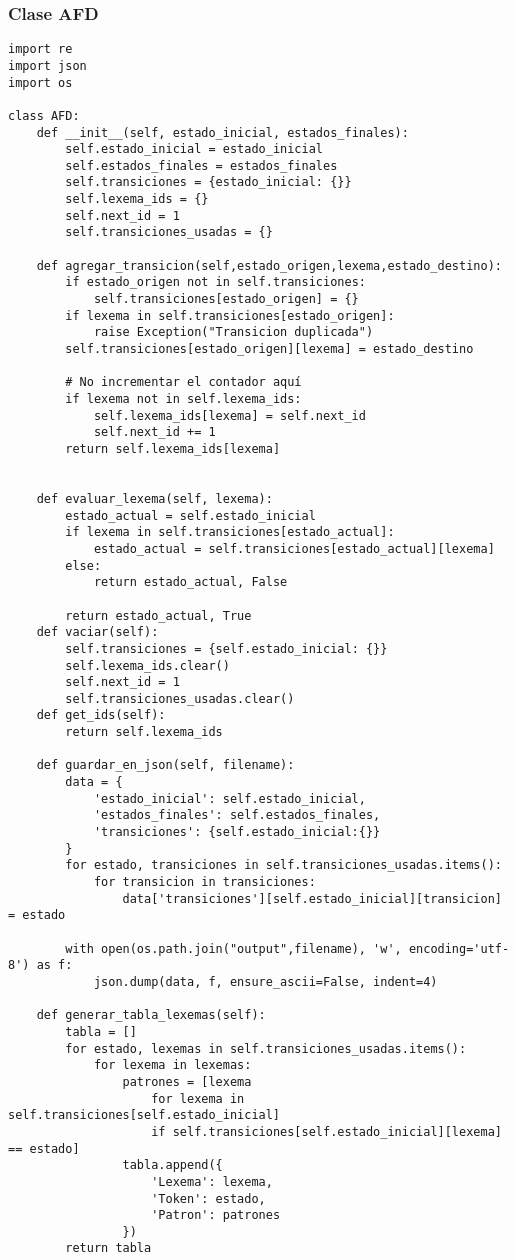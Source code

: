 \documentclass[12pt,a4paper]{article}
\begin{document}
\subsubsection{Clase AFD}

\begin{verbatim}
import re
import json
import os

class AFD:
    def __init__(self, estado_inicial, estados_finales):
        self.estado_inicial = estado_inicial
        self.estados_finales = estados_finales
        self.transiciones = {estado_inicial: {}}
        self.lexema_ids = {}
        self.next_id = 1
        self.transiciones_usadas = {}  
        
    def agregar_transicion(self,estado_origen,lexema,estado_destino):
        if estado_origen not in self.transiciones:
            self.transiciones[estado_origen] = {}
        if lexema in self.transiciones[estado_origen]:
            raise Exception("Transicion duplicada")
        self.transiciones[estado_origen][lexema] = estado_destino
        
        # No incrementar el contador aquí
        if lexema not in self.lexema_ids:
            self.lexema_ids[lexema] = self.next_id
            self.next_id += 1
        return self.lexema_ids[lexema]


    def evaluar_lexema(self, lexema):
        estado_actual = self.estado_inicial
        if lexema in self.transiciones[estado_actual]:
            estado_actual = self.transiciones[estado_actual][lexema]
        else:
            return estado_actual, False

        return estado_actual, True
    def vaciar(self):
        self.transiciones = {self.estado_inicial: {}}
        self.lexema_ids.clear()  
        self.next_id = 1
        self.transiciones_usadas.clear()    
    def get_ids(self):
        return self.lexema_ids

    def guardar_en_json(self, filename):
        data = {
            'estado_inicial': self.estado_inicial,
            'estados_finales': self.estados_finales,
            'transiciones': {self.estado_inicial:{}}
        }
        for estado, transiciones in self.transiciones_usadas.items():
            for transicion in transiciones:
                data['transiciones'][self.estado_inicial][transicion] = estado  
                                    
        with open(os.path.join("output",filename), 'w', encoding='utf-8') as f:
            json.dump(data, f, ensure_ascii=False, indent=4)
        
    def generar_tabla_lexemas(self):
        tabla = []
        for estado, lexemas in self.transiciones_usadas.items():
            for lexema in lexemas:
                patrones = [lexema 
                    for lexema in self.transiciones[self.estado_inicial] 
                    if self.transiciones[self.estado_inicial][lexema] == estado]
                tabla.append({
                    'Lexema': lexema,
                    'Token': estado,
                    'Patron': patrones
                })
        return tabla
\end{verbatim}
\end{document}
